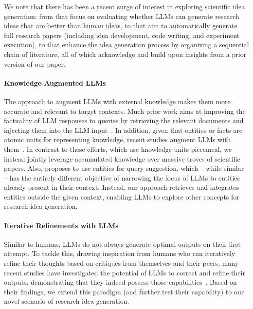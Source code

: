 We note that there has been a recent surge of interest in exploring scientific idea generation: from \citet{li2024chainideasrevolutionizingresearch} that focus on evaluating whether LLMs can generate research ideas that are better than human ideas, to \citet{lu2024aiscientistfullyautomated} that aim to automatically generate full research papers (including idea development, code writing, and experiment execution), to \citet{li2024chainideasrevolutionizingresearch} that enhance the idea generation process by organizing a sequential chain of literature, all of which acknowledge and build upon insights from a prior version of our paper.

\paragraph{Knowledge-Augmented LLMs}
The approach to augment LLMs with external knowledge makes them more accurate and relevant to target contexts. Much prior work aims at improving the factuality of LLM responses to queries by retrieving the relevant documents and injecting them into the LLM input~\cite{InternetaugmentedLM, InContextRetrieval, REPLUG}. In addition, given that entities or facts are atomic units for representing knowledge, recent studies augment LLMs with them~\cite{KAPING, RetrieveRewriteAnswer}. In contrast to these efforts, which use knowledge units piecemeal, we instead jointly leverage accumulated knowledge over massive troves of scientific papers. Also, \citet{K-LaMP} proposes to use entities for query suggestion, which -- while similar -- has the entirely different objective of narrowing the focus of LLMs to entities already present in their context. Instead, our approach retrieves and integrates entities outside the given context, enabling LLMs to explore other concepts for research idea generation.

\paragraph{Iterative Refinements with LLMs}
Similar to humans, LLMs do not always generate optimal outputs on their first attempt. To tackle this, drawing inspiration from humans who can iteratively refine their thoughts based on critiques from themselves and their peers, many recent studies have investigated the potential of LLMs to correct and refine their outputs, demonstrating that they indeed possess those capabilities~\cite{self-refine/0, self-refine/1, self-refine/2, self-refine/3, CLBD, zeroshot/hypothesis, tomato}. Based on their findings, we extend this paradigm (and further test their capability) to our novel scenario of research idea generation.


